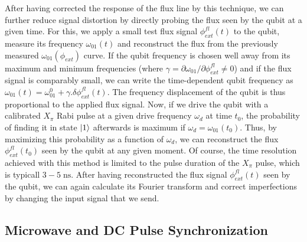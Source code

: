 After having corrected the response of the flux line by this technique, we can further reduce signal distortion by directly probing the flux seen by the qubit at a given time. For this, we apply a small test flux signal $\phi_{ext}^{fl}(t)$ to the qubit, measure its frequency $\omega_{01}(t)$ and reconstruct the flux from the previously measured  $\omega_{01}(\phi_{ext})$ curve. If the qubit frequency is chosen well away from its maximum and minimum frequencies (where $\gamma=\partial \omega_{01}/\partial \phi_{ext}^{fl} \ne 0$) and if the flux signal is comparably small, we can write the time-dependent qubit frequency as $\omega_{01}(t)=\omega_{01}^0+\gamma.\delta\phi_{ext}^{fl}(t)$. The frequency displacement of the qubit is thus proportional to the applied flux signal. Now, if we drive the qubit with a calibrated $X_\pi$ Rabi pulse at a given drive frequency $\omega_{d}$ at time $t_0$, the probability of finding it in state $\left| 1 \right>$ afterwards is maximum if $\omega_{d}=\omega_{01}(t_0)$. Thus, by maximizing this probability as a function of $\omega_{d}$, we can reconstruct the flux $\phi_{ext}^{fl}(t_0)$ seen by the qubit at any given moment. Of course, the time resolution achieved with this method is limited to the pulse duration of the $X_\pi$ pulse, which is typicall $3-5\;\mathrm{ns}$. After having reconstructed the flux signal $\phi_{ext}^{fl}(t)$ seen by the qubit, we can again calculate its Fourier transform and correct imperfections by changing the input signal that we send.

\subsection{Microwave and DC Pulse Synchronization}

